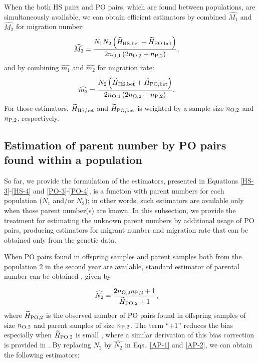 \documentclass[12pt, English]{article}
\begin{document}
\begin{spacing}{1.9}
When the both HS pairs and PO pairs, which are found between populations, are simultaneously available, we can obtain efficient estimators by combined $\widehat{M_1}$ and $\widehat{M_2}$ for migration number: 
\begin{align}
\widehat{M_3} &= \frac{ N_{1} N_{2} \left(\widetilde{H}_{\rm HS,bet} + \widetilde{H}_{\rm PO,bet}\right) } {2n_{\rm O, 1} \left(2 n_{\rm O, 2} + n_{\rm P, 2}\right) },
\label{AP-1}
\end{align}
and by combining $\widehat{m_1}$ and $\widehat{m_2}$ for migration rate: 
\begin{align}
\widehat{m_3} &= \frac{ N_{2} \left(\widetilde{H}_{\rm HS,bet} + \widetilde{H}_{\rm PO,bet}\right) } {2n_{\rm O, 1} \left(2 n_{\rm O, 2} + n_{\rm P, 2}\right)}.
\label{AP-2}
\end{align}
For those estimators, $\widetilde{H}_{\rm HS,bet}$ and $\widetilde{H}_{\rm PO,bet}$ is weighted by a sample size $n_{\rm O, 2}$ and $n_{\rm P, 2}$, respectively. 

\subsection{Estimation of parent number by PO pairs found within a population}

So far, we provide the formulation of the estimators, presented in Equations \ref{HS-3}-\ref{HS-4} and \ref{PO-3}-\ref{PO-4}, is a function with parent numbers for each population ($N_1$ and/or $N_2$); in other words, such estimators are available only when those parent number(s) are known. In this subsection, we provide the treatment for estimating the unknown parent numbers by additional usage of PO pairs, producing estimators for migrant number and migration rate that can be obtained only from the genetic data. 

When PO pairs found in offspring samples and parent samples both from the population 2 in the second year are available, standard estimator of parental number can be obtained \cite[]{bravington2016close}, given by

\begin{align}
\widehat{N_2} &= \frac{ 2 n_{\rm O, 2} n_{\rm P, 2} + 1 }{\widetilde{H}_{\rm PO, 2} + 1} ,
\label{AP-3}
\end{align}
where $\widetilde{H}_{\rm PO, 2}$ is the observed number of PO pairs found in offspring samples of size $n_{\rm O, 2}$ and parent samples of size $n_{\rm P, 2}$. The term ``$+1$'' reduces the bias especially when $\widetilde{H}_{\rm PO, 2}$ is small \cite[e.g.,][]{ecolevol2021p}, where a similar derivation of this bias correction is provided in \cite{Akita_2019}. By replacing $N_2$ by $\widehat{N_2}$ in Eqs.~\ref{AP-1} and \ref{AP-2}, we can obtain the following estimators: 


\end{spacing}
\end{document}
